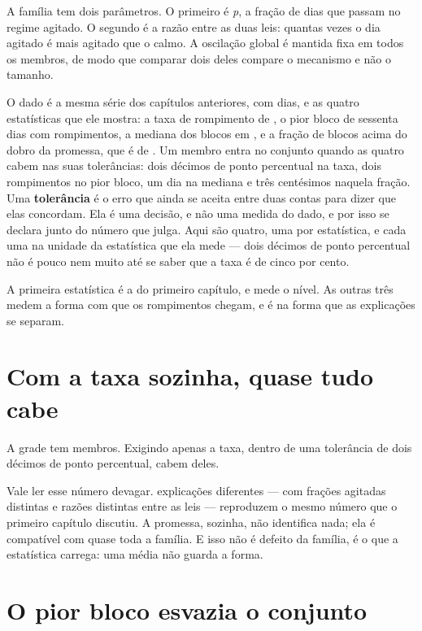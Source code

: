 A família tem dois parâmetros. O primeiro é \emph{p}, a fração de dias que passam no regime
agitado. O segundo é a razão entre as duas leis: quantas vezes o dia agitado é mais
agitado que o calmo. A oscilação global é mantida fixa em todos os membros, de modo que comparar
dois deles compare o mecanismo e não o tamanho.

O dado é a mesma série dos capítulos anteriores, com \numCondicionamentoDias{} dias, e as quatro
estatísticas que ele mostra: a taxa de rompimento de \numCondicionamentoTaxa, o pior bloco de
sessenta dias com \numCondicionamentoPior{} rompimentos, a mediana dos blocos em
\numCondicionamentoMediana, e a fração de blocos acima do dobro da promessa, que é de
\numCondicionamentoAcimaDoDobro. Um membro entra no conjunto quando as quatro cabem nas suas
tolerâncias: dois décimos de ponto percentual na taxa, dois rompimentos no pior bloco, um dia na
mediana e três centésimos naquela fração.
Uma \textbf{tolerância} é o erro que ainda se aceita entre duas contas para dizer que elas
concordam. Ela é uma decisão, e não uma medida do dado, e por isso se declara junto do número que julga.
Aqui são quatro, uma por estatística, e cada uma na unidade da estatística que ela mede --- dois
décimos de ponto percentual não é pouco nem muito até se saber que a taxa é de cinco por cento.

A primeira estatística é a do primeiro capítulo, e mede o nível. As outras três medem a forma com
que os rompimentos chegam, e é na forma que as explicações se separam.

\section{Com a taxa sozinha, quase tudo cabe}

A grade tem \numCondicionamentoCombinacoes{} membros. Exigindo apenas a taxa, dentro de uma
tolerância de dois décimos de ponto percentual, cabem \numCondicionamentoCabemTaxa{} deles.

Vale ler esse número devagar. \numCondicionamentoCabemTaxa{} explicações diferentes --- com frações agitadas
distintas e razões distintas entre as leis --- reproduzem o mesmo número que o primeiro capítulo discutiu. A promessa, sozinha, não identifica nada; ela é compatível com quase
toda a família. E isso não é defeito da família, é o que a estatística carrega: uma média não
guarda a forma.

\section{O pior bloco esvazia o conjunto}

